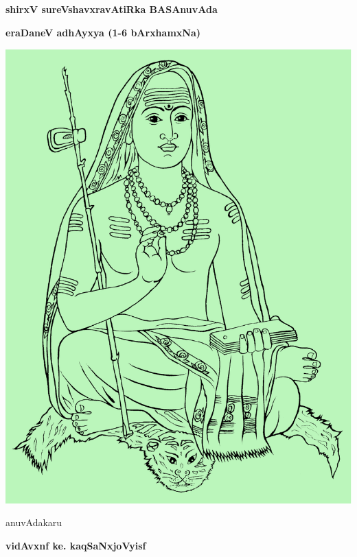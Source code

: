 \documentclass{book}
\begin{document}
\pagecolor{cblue}
\mbox{}\thispagestyle{empty}
\vskip 1.5cm
\begin{center}
{\Huge\bfseries shirxV sureVshavxravAtiRka BASAnuvAda}
\bigskip

{\Large\bfseries eraDaneV adhAyxya (1-6 bArxhamxNa)}

\vfill

\includegraphics[scale=0.6]{shankaracharya.eps}

\vfill

anuvAdakaru
\smallskip

{\large\bfseries vidAvxnf ke. kaqSaNxjoVyisf}
\vskip 2cm

\end{center}
\end{document}
